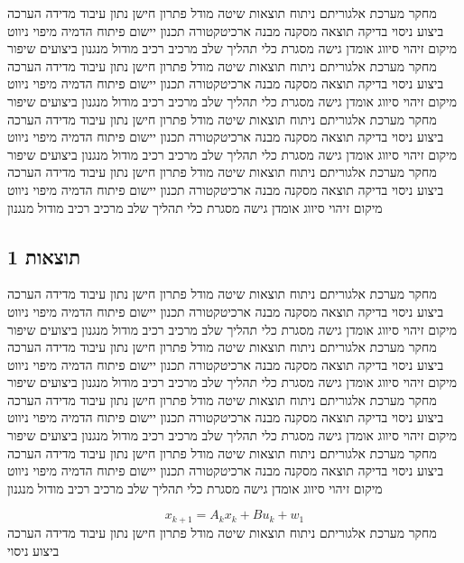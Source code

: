 מחקר מערכת אלגוריתם ניתוח תוצאות שיטה מודל פתרון חישן נתון עיבוד מדידה הערכה ביצוע ניסוי בדיקה תוצאה מסקנה מבנה ארכיטקטורה תכנון יישום פיתוח הדמיה מיפוי ניווט מיקום זיהוי סיווג אומדן גישה מסגרת כלי תהליך שלב מרכיב רכיב מודול מנגנון ביצועים שיפור מחקר מערכת אלגוריתם ניתוח תוצאות שיטה מודל פתרון חישן נתון עיבוד מדידה הערכה ביצוע ניסוי בדיקה תוצאה מסקנה מבנה ארכיטקטורה תכנון יישום פיתוח הדמיה מיפוי ניווט מיקום זיהוי סיווג אומדן גישה מסגרת כלי תהליך שלב מרכיב רכיב מודול מנגנון ביצועים שיפור מחקר מערכת אלגוריתם ניתוח תוצאות שיטה מודל פתרון חישן נתון עיבוד מדידה הערכה ביצוע ניסוי בדיקה תוצאה מסקנה מבנה ארכיטקטורה תכנון יישום פיתוח הדמיה מיפוי ניווט מיקום זיהוי סיווג אומדן גישה מסגרת כלי תהליך שלב מרכיב רכיב מודול מנגנון ביצועים שיפור מחקר מערכת אלגוריתם ניתוח תוצאות שיטה מודל פתרון חישן נתון עיבוד מדידה הערכה ביצוע ניסוי בדיקה תוצאה מסקנה מבנה ארכיטקטורה תכנון יישום פיתוח הדמיה מיפוי ניווט מיקום זיהוי סיווג אומדן גישה מסגרת כלי תהליך שלב מרכיב רכיב מודול מנגנון

\subsection{תוצאות 1}
\label{sub:ch08_1}
מחקר מערכת אלגוריתם ניתוח תוצאות שיטה מודל פתרון חישן נתון עיבוד מדידה הערכה ביצוע ניסוי בדיקה תוצאה מסקנה מבנה ארכיטקטורה תכנון יישום פיתוח הדמיה מיפוי ניווט מיקום זיהוי סיווג אומדן גישה מסגרת כלי תהליך שלב מרכיב רכיב מודול מנגנון ביצועים שיפור מחקר מערכת אלגוריתם ניתוח תוצאות שיטה מודל פתרון חישן נתון עיבוד מדידה הערכה ביצוע ניסוי בדיקה תוצאה מסקנה מבנה ארכיטקטורה תכנון יישום פיתוח הדמיה מיפוי ניווט מיקום זיהוי סיווג אומדן גישה מסגרת כלי תהליך שלב מרכיב רכיב מודול מנגנון ביצועים שיפור מחקר מערכת אלגוריתם ניתוח תוצאות שיטה מודל פתרון חישן נתון עיבוד מדידה הערכה ביצוע ניסוי בדיקה תוצאה מסקנה מבנה ארכיטקטורה תכנון יישום פיתוח הדמיה מיפוי ניווט מיקום זיהוי סיווג אומדן גישה מסגרת כלי תהליך שלב מרכיב רכיב מודול מנגנון ביצועים שיפור מחקר מערכת אלגוריתם ניתוח תוצאות שיטה מודל פתרון חישן נתון עיבוד מדידה הערכה ביצוע ניסוי בדיקה תוצאה מסקנה מבנה ארכיטקטורה תכנון יישום פיתוח הדמיה מיפוי ניווט מיקום זיהוי סיווג אומדן גישה מסגרת כלי תהליך שלב מרכיב רכיב מודול מנגנון

\begin{equation}
    x_{k+1} = A_{k} x_k + B u_{k} + w_{1}
    \label{eq:ch08_1}
\end{equation}
מחקר מערכת אלגוריתם ניתוח תוצאות שיטה מודל פתרון חישן נתון עיבוד מדידה הערכה ביצוע ניסוי

